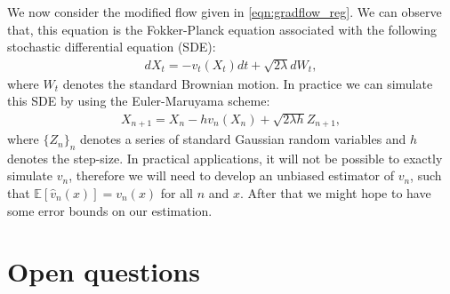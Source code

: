 \documentclass{article}
\begin{document}
We now consider the modified flow given in \eqref{eqn:gradflow_reg}. We can observe that, this equation is the Fokker-Planck equation associated with the following stochastic differential equation (SDE):
\begin{align}
d X_t = - v_t(X_t) dt + \sqrt{2 \lambda } d W_t,
\end{align}
where $W_t$ denotes the standard Brownian motion. In practice we can simulate this SDE by using the Euler-Maruyama scheme:
\begin{align}
X_{n+1} = X_n - h v_n(X_n) + \sqrt{2 \lambda h} Z_{n+1},
\end{align}
where $\{Z_n\}_{n}$ denotes a series of standard Gaussian random variables and $h$ denotes the step-size. In practical applications, it will not be possible to exactly simulate $v_n$, therefore we will need to develop an unbiased estimator of $v_n$, such that $\mathbb{E}[\hat{v}_n (x)] = v_n(x)$ for all $n$ and $x$. After that we might hope to have some error bounds on our estimation.



\section{Open questions}
\end{document}
